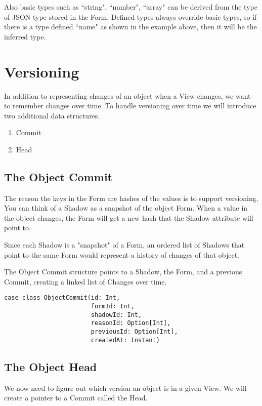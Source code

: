 \documentclass[11pt]{article}
\begin{document}
Also basic types such as ``string", ``number", ``array" can be derived from the
type of JSON type stored in the Form. Defined types always override basic types,
so if there is a type defined ``name" as shown in the example above, then it
will be the inferred type.

\newpage
\section{Versioning}

In addition to representing changes of an object when a View changes, we want 
to remember changes over time. To handle versioning over time we will introduce 
two additional data structures.

\begin{enumerate}
    \item Commit
    \item Head
\end{enumerate}

\subsection{The Object Commit}

The reason the keys in the Form are hashes of the values is to support versioning.
You can think of a Shadow as a snapshot of the object Form. When a value in 
the object changes, the Form will get a new hash that the Shadow attribute will point 
to.

Since each Shadow is a "snapshot" of a Form, an ordered list of Shadows that 
point to the same Form would represent a history of changes of that object.

The Object Commit structure points to a Shadow, the Form, and a previous Commit,
creating a linked list of Changes over time.

\begin{lstlisting}
case class ObjectCommit(id: Int,
                        formId: Int,
                        shadowId: Int,
                        reasonId: Option[Int],
                        previousId: Option[Int],
                        createdAt: Instant)
\end{lstlisting}

\subsection{The Object Head}

We now need to figure out which version an object is in a given View. 
We will create a pointer to a Commit called the Head.
\end{document}
